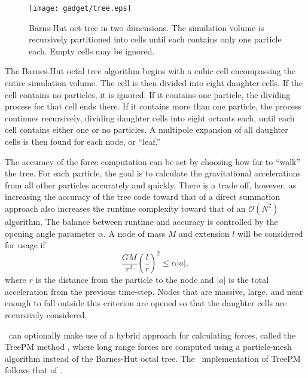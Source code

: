 \begin{figure}[t]
	\centering
	\texttt{[image: gadget/tree.eps]}
	\caption[Barns-Hut oct-tree in two dimensions.]{\footnotesize Barns-Hut oct-tree in two dimensions.  The simulation volume is recursively partitioned into cells until each contains only one particle each.  Empty cells may be ignored.  \citep{2001NewA....6...79S}}
	\label{fig:gadget--gadget--tree}
\end{figure}

The Barnes-Hut octal tree algorithm begins with a cubic cell encompassing the entire simulation volume.  The cell is then divided into eight daughter cells.  If the cell contains no particles, it is ignored.  If it contains one particle, the dividing process for that cell ends there.  If it contains more than one particle, the process continues recursively, dividing daughter cells into eight octants each, until each cell contains either one or no particles.  A multipole expansion of all daughter cells is then found for each node, or ``leaf.''

The accuracy of the force computation can be set by choosing how far to ``walk'' the tree.  For each particle, the goal is to calculate the gravitational accelerations from all other particles accurately and quickly.  There is a trade off, however, as increasing the accuracy of the tree code toward that of a direct summation approach also increases the runtime complexity toward that of an $\mathcal{O}(N^{2})$ algorithm.  The balance between runtime and accuracy is controlled by the opening angle parameter $\alpha$.  A node of mass $M$ and extension $l$ will be considered for usage if
\begin{equation}
	\frac{GM}{r^{2}} \left( \frac{l}{r} \right)^{2} \leq \alpha |a|,
\end{equation}
where $r$ is the distance from the particle to the node and $|a|$ is the total acceleration from the previous time-step.  Nodes that are massive, large, and near enough to fall outside this criterion are opened so that the daughter cells are recursively considered.

\gadgettwo\ can optionally make use of a hybrid approach for calculating forces, called the TreePM method \citep{1995ApJS...98..355X, 2000ApJS..128..561B, 2002JApA...23..185B}, where long range forces are computed using a particle-mesh algorithm instead of the Barnes-Hut octal tree.  The \gadgettwo\ implementation of TreePM follows that of \citet{2003NewA....8..665B}.




